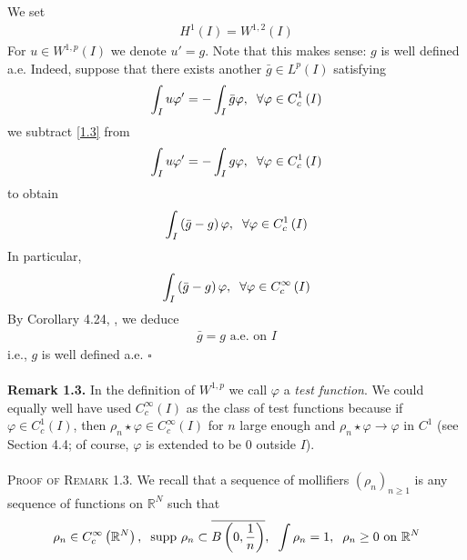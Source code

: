 \documentclass[a4paper,oneside]{book}
\numberwithin{equation}{chapter}
\begin{document}
We set 
\begin{align}
{H^1}\left( I \right) = {W^{1,2}}\left( I \right)
\end{align}
For $u \in {W^{1,p}}\left( I \right)$ we denote $u'=g$. Note that this makes sense: $g$ is well defined a.e. Indeed, suppose that there exists another $\bar{g} \in L^p\left(I\right)$ satisfying
\begin{align}
\label{1.3}
\int_I {u\varphi '}  =  - \int_I {\bar g\varphi } ,\hspace{0.2cm}\forall \varphi  \in C_c^1\left( I \right)
\end{align}
we subtract \eqref{1.3} from
\begin{align}
\int_I {u\varphi '}  =  - \int_I {g\varphi } ,\hspace{0.2cm}\forall \varphi  \in C_c^1\left( I \right)
\end{align}
to obtain
\begin{align}
\int_I {\left( {\bar g - g} \right)\varphi } ,\hspace{0.2cm}\forall \varphi  \in C_c^1\left( I \right)
\end{align}
In particular, 
\begin{align}
\int_I {\left( {\bar g - g} \right)\varphi } ,\hspace{0.2cm}\forall \varphi  \in C_c^\infty \left( I \right)
\end{align}
By Corollary 4.24, \cite{1}, we deduce 
\begin{align}
\bar{g} =g \mbox{ a.e. on } I 
\end{align}
i.e., $g$ is well defined a.e. \hfill $\square$\\
\\
\textbf{Remark 1.3.} In the definition of $W^{1,p}$ we call  $\varphi$ a \textit{test function}. We could equally well have used $C_c^\infty \left(I\right)$ as the class of test functions because if $\varphi  \in C_c^1\left( I \right)$, then ${\rho _n} \star \varphi  \in C_c^\infty \left( I \right)$ for $n$ large enough and ${\rho _n} \star \varphi  \to \varphi $ in $C^1$ (see \cite{1} Section 4.4; of course, $\varphi$ is extended to be 0 outside $I$).\\
\\
\textsc{Proof of Remark 1.3.} We recall that a sequence of mollifiers ${\left( {{\rho _n}} \right)_{n \ge 1}}$ is any sequence of functions on $\mathbb{R}^N$ such that
\begin{align}
{\rho _n} \in C_c^\infty \left( {{\mathbb{R}^N}} \right),\hspace{0.2cm}\mbox{supp }{\rho _n} \subset \overline {B\left( {0,\frac{1}{n}} \right)} ,\hspace{0.2cm}\int {{\rho _n}}  = 1,\hspace{0.2cm}{\rho _n} \ge 0\mbox{ on }{\mathbb{R}^N}
\end{align}
\end{document}
